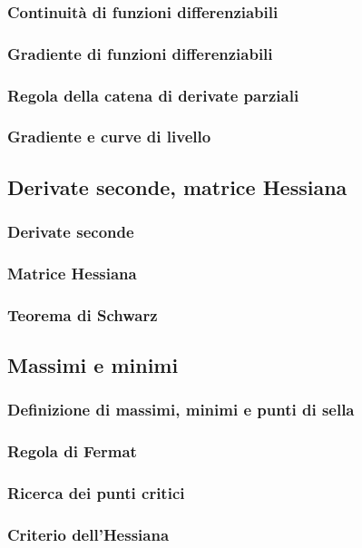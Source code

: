 \documentclass[a4paper]{article}
\begin{document}
\subsubsection*{Continuità di funzioni differenziabili}
\subsubsection*{Gradiente di funzioni differenziabili}
\subsubsection*{Regola della catena di derivate parziali}
\subsubsection*{Gradiente e curve di livello}

\subsection{Derivate seconde, matrice Hessiana}
\subsubsection*{Derivate seconde}
\subsubsection*{Matrice Hessiana}
\subsubsection*{Teorema di Schwarz}

\subsection{Massimi e minimi}
\subsubsection*{Definizione di massimi, minimi e punti di sella}
\subsubsection*{Regola di Fermat}
\subsubsection*{Ricerca dei punti critici}
\subsubsection*{Criterio dell'Hessiana}
\end{document}

